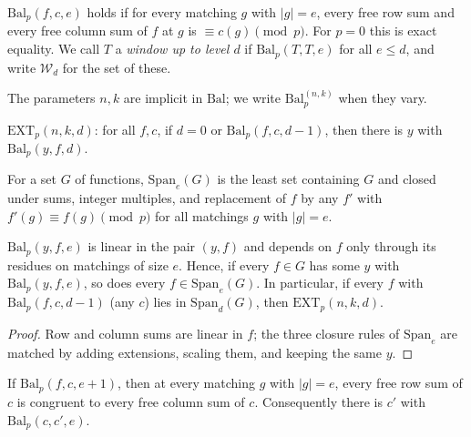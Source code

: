\begin{definition}\label{def:bal}
$\mathrm{Bal}_p(f,c,e)$ holds if for every matching $g$ with $|g|=e$, every free
row sum and every free column sum of $f$ at $g$ is $\equiv c(g)\pmod p$.  For
$p=0$ this is exact equality.  We call $T$ a \emph{window up to level $d$} if
$\mathrm{Bal}_p(T,T,e)$ for all $e\le d$, and write $\mathcal W_d$ for the set of
these.
\end{definition}

The parameters $n,k$ are implicit in $\mathrm{Bal}$; we write
$\mathrm{Bal}_p^{(n,k)}$ when they vary.

\begin{definition}\label{def:ext}
$\mathrm{EXT}_p(n,k,d)$: for all $f,c$, if $d=0$ or $\mathrm{Bal}_p(f,c,d-1)$, then
there is $y$ with $\mathrm{Bal}_p(y,f,d)$.
\end{definition}

For a set $G$ of functions, $\mathrm{Span}_e(G)$ is the least set containing $G$
and closed under sums, integer multiples, and replacement of $f$ by any $f'$ with
$f'(g)\equiv f(g)\pmod p$ for all matchings $g$ with
$|g|=e$.

\begin{lemma}\label{lem:ext-span}
$\mathrm{Bal}_p(y,f,e)$ is linear in the pair $(y,f)$ and depends on $f$ only
through its residues on matchings of size $e$.  Hence, if every $f\in G$ has some
$y$ with $\mathrm{Bal}_p(y,f,e)$, so does every $f\in\mathrm{Span}_e(G)$.  In
particular, if every $f$ with $\mathrm{Bal}_p(f,c,d-1)$ (any $c$) lies in
$\mathrm{Span}_d(G)$, then $\mathrm{EXT}_p(n,k,d)$.
\end{lemma}

\begin{proof}
Row and column sums are linear in $f$; the three closure rules of
$\mathrm{Span}_e$ are matched by adding extensions, scaling them, and keeping the
same $y$.
\end{proof}

\begin{lemma}\label{lem:flag}
If $\mathrm{Bal}_p(f,c,e+1)$, then at every matching $g$ with $|g|=e$, every free
row sum of $c$ is congruent to every free column sum of $c$.  Consequently there
is $c'$ with $\mathrm{Bal}_p(c,c',e)$.
\end{lemma}

